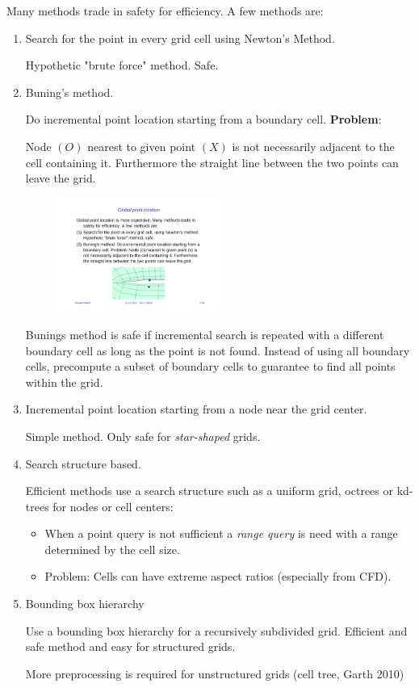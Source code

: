Many methods trade in safety for efficiency. A few methods are:
\begin{enumerate}
\item Search for the point in every grid cell using Newton's Method.

Hypothetic "brute force" method. Safe.
\item Buning's method.

Do incremental point location starting from a boundary cell. \textbf{Problem}:

Node $(O)$ nearest to given point $(X)$ is not necessarily adjacent to the cell containing it. Furthermore the straight line between the two points can leave the grid.
    \begin{figure}[H]
        \centering
        \includegraphics[width=0.5\textwidth]{img/05_bunings_method}
    \end{figure}
    
    Bunings method is safe if incremental search is repeated with a different boundary cell as long as the point is not found. Instead of using all boundary cells, precompute a subset of boundary cells to guarantee to find all points within the grid.
\item Incremental point location starting from a node near the grid center.

Simple method. Only safe for \emph{star-shaped} grids.
\item Search structure based.

Efficient methods use a search structure such as a uniform grid, octrees or kd-trees for nodes or cell centers:
\begin{itemize}
    \item When a point query is not sufficient a \emph{range query} is need with a range determined by the cell size.
    \item Problem: Cells can have extreme aspect ratios (especially from CFD).
\end{itemize}
\item Bounding box hierarchy

Use a bounding box hierarchy for a recursively subdivided grid. Efficient and safe method and easy for structured grids.

More preprocessing is required for unstructured grids (cell tree, Garth 2010)
\end{enumerate}

